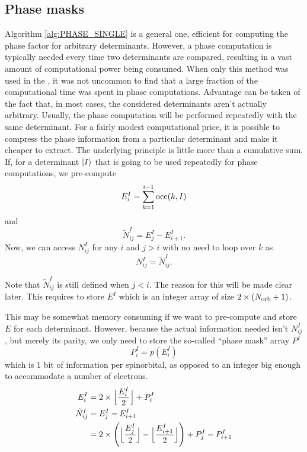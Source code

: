 \documentclass[./thesis.tex]{subfiles}
\begin{document}
\subsection{Phase masks}
\label{chap:PHASEMASK}

Algorithm \ref{alg:PHASE_SINGLE} is a general one, efficient for computing the phase factor for arbitrary determinants. However, a phase computation is typically needed every time two determinants are compared, resulting in a vast amount of computational power being consumed. When only this method was used in the \QP, it was not uncommon to find that a large fraction of the computational time was spent in phase computations.
Advantage can be taken of the fact that, in most cases, the considered determinants aren't actually arbitrary. Usually, the phase computation will be performed repeatedly with the same determinant. For a fairly modest computational price, it is possible to compress the phase information from a particular determinant and make it cheaper to extract. The underlying principle is little more than a cumulative sum. If, for a determinant $\ket{I}$ that is going to be used repeatedly for phase computations, we pre-compute
\begin{equation}
E^I_i = \sum_{k=1}^{i-1} {\text{occ}(k,I)}
\end{equation}
and
\begin{equation}
\tilde{N}^I_{ij} = E^I_j - E^I_{i+1}.
\end{equation}
Now, we can access $N^I_{ij}$ for any $i$ and $j>i$ with no need to loop over $k$ as
\begin{equation}
N^I_{ij} = \tilde N^I_{ij}.
\end{equation}


Note that $\tilde N^I_{ij}$ is still defined when $j<i$. The reason for this will be made clear later.
This requires to store $E^I$ which is an integer array of size $2 \times ({N_\text{orb}}+1)$. 


This may be somewhat memory consuming if we want to pre-compute and store $E$ for each determinant. However, because the actual information needed isn't $N^I_{ij}$, but merely its parity, we only need to store the so-called ``phase mask'' array $P^I$
\begin{equation}
\label{eq:phasemask}
P^I_i = p(E^I_i)
\end{equation}
which is 1 bit of information per spinorbital, as opposed to an integer big enough to accommodate a number of electrons.
\begin{align}
E^I_i & = 2 \times  \Big \lfloor \frac{E^I_i}{2} \Big \rfloor + P^I_i \\
\tilde N^I_{ij} & = E^I_j - E^I_{i+1} \\
 & = 2 \times \qty( \Big \lfloor \frac{E^I_j}{2} \Big \rfloor - \Big \lfloor \frac{E^I_{i+1}}{2} \Big \rfloor ) + P^I_j - P^I_{i+1}
\end{align}
	    
\end{document}
